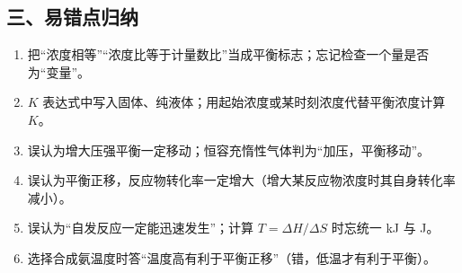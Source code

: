 \subsection*{三、易错点归纳}
\begin{enumerate}
\item 把“浓度相等”“浓度比等于计量数比”当成平衡标志；忘记检查一个量是否为“变量”。
\item $K$ 表达式中写入固体、纯液体；用起始浓度或某时刻浓度代替平衡浓度计算 $K$。
\item 误认为增大压强平衡一定移动；恒容充惰性气体判为“加压，平衡移动”。
\item 误认为平衡正移，反应物转化率一定增大（增大某反应物浓度时其自身转化率减小）。
\item 误认为“自发反应一定能迅速发生”；计算 $T=\Delta H/\Delta S$ 时忘统一 kJ 与 J。
\item 选择合成氨温度时答“温度高有利于平衡正移”（错，低温才有利于平衡）。
\end{enumerate}


